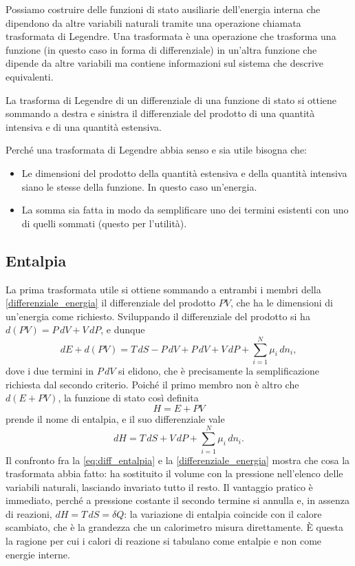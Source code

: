 Possiamo costruire delle funzioni di stato ausiliarie dell’energia interna che dipendono da altre variabili naturali tramite una operazione chiamata trasformata di Legendre. Una trasformata è una operazione che trasforma una funzione (in questo caso in forma di differenziale) in un’altra funzione che dipende da altre variabili ma contiene informazioni sul sistema che descrive equivalenti.

La trasforma di Legendre di un differenziale di una funzione di stato si ottiene sommando a destra e sinistra il differenziale del prodotto di una quantità intensiva e di una quantità estensiva.

Perché una trasformata di Legendre abbia senso e sia utile bisogna che:

\begin{itemize}
    \item Le dimensioni del prodotto della quantità estensiva e della quantità intensiva siano le stesse della funzione. In questo caso un’energia.
    \item La somma sia fatta in modo da semplificare uno dei termini esistenti con uno di quelli sommati (questo per l’utilità).
\end{itemize}

\subsection{Entalpia}

La prima trasformata utile si ottiene sommando a entrambi i membri della \eqref{differenziale_energia} il differenziale del prodotto $PV$, che ha le dimensioni di un'energia come richiesto.
Sviluppando il differenziale del prodotto si ha $d(PV) = P\,dV + V\,dP$, e dunque
\begin{equation}
    dE + d(PV) = T\,dS - P\,dV + P\,dV + V\,dP + \sum_{i=1}^{N}\mu_i\,dn_i ,
    \label{eq:entalpia_passaggio}
\end{equation}
dove i due termini in $P\,dV$ si elidono, che è precisamente la semplificazione richiesta dal secondo criterio.
Poiché il primo membro non è altro che $d(E + PV)$, la funzione di stato così definita
\begin{equation}
    H = E + PV
    \label{eq:def_entalpia}
\end{equation}
prende il nome di entalpia, e il suo differenziale vale
\begin{equation}
    dH = T\,dS + V\,dP + \sum_{i=1}^{N}\mu_i\,dn_i .
    \label{eq:diff_entalpia}
\end{equation}
Il confronto fra la \eqref{eq:diff_entalpia} e la \eqref{differenziale_energia} mostra che cosa la trasformata abbia fatto: ha sostituito il volume con la pressione nell'elenco delle variabili naturali, lasciando invariato tutto il resto.
Il vantaggio pratico è immediato, perché a pressione costante il secondo termine si annulla e, in assenza di reazioni, $dH = T\,dS = \delta Q$: la variazione di entalpia coincide con il calore scambiato, che è la grandezza che un calorimetro misura direttamente.
È questa la ragione per cui i calori di reazione si tabulano come entalpie e non come energie interne.

